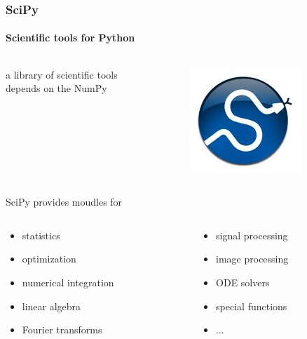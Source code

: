 \documentclass[compress=true]{beamer}
\begin{document}
\begin{frame}
	\frametitle{SciPy}
	\framesubtitle{Scientific tools for Python}
	\begin{columns}
		\begin{column}{0.5\textwidth}
			\begin{center}
				a library of scientific tools  \\
				depends on the NumPy 
			\end{center}
		\end{column}
		\begin{column}{0.5\textwidth}
			\begin{figure}
				\includegraphics[height=0.3\textheight]{scipy.png}
			\end{figure}
		\end{column}
	\end{columns}
	SciPy provides moudles for
	\begin{columns}
		\begin{column}{0.5\textwidth}
			\begin{itemize}
				\item statistics\\
				\item optimization\\
				\item numerical integration\\
				\item linear algebra\\
				\item Fourier transforms
			\end{itemize}
		\end{column}	
		\begin{column}{0.5\textwidth}
			\begin{itemize}
				\item signal processing\\
				\item image processing\\
				\item ODE solvers\\
				\item special functions 
				\item ...
			\end{itemize}
		\end{column}
	\end{columns}
\end{frame}
\end{document}
